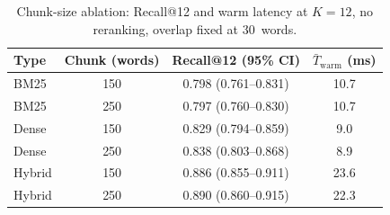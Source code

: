 \begin{table}[ht]
\centering
\small
\caption{Chunk-size ablation: Recall@12 and warm latency at $K=12$, no reranking, overlap fixed at 30~words.}
\label{tab:chunking}
\begin{tabular}{lccc}
\toprule
Type & Chunk (words) & Recall@12 (95\% CI) & $\bar{T}_\mathrm{warm}$ (ms) \\
\midrule
BM25 & 150 & 0.798 (0.761--0.831) & 10.7 \\
BM25 & 250 & 0.797 (0.760--0.830) & 10.7 \\
\midrule
Dense & 150 & 0.829 (0.794--0.859) & 9.0 \\
Dense & 250 & 0.838 (0.803--0.868) & 8.9 \\
\midrule
Hybrid & 150 & 0.886 (0.855--0.911) & 23.6 \\
Hybrid & 250 & 0.890 (0.860--0.915) & 22.3 \\
\bottomrule
\end{tabular}
\end{table}
